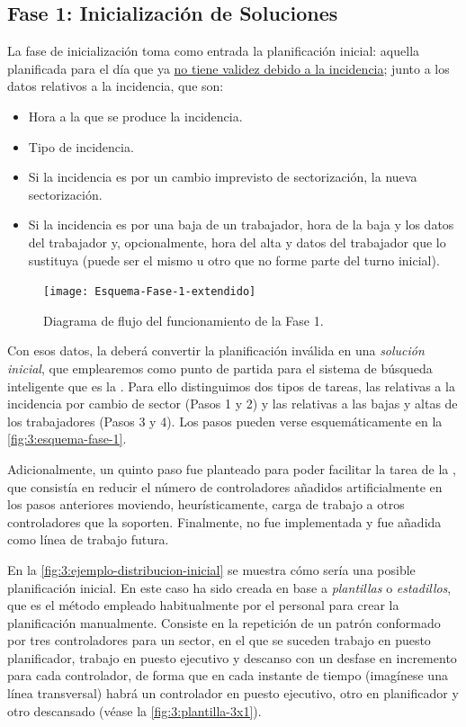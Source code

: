\subsection{Fase 1: Inicialización de Soluciones} \label{sec:3:inicializacion-soluciones}

La fase de inicialización toma como entrada la planificación inicial: aquella planificada para el día que ya \underline{no tiene validez debido a la incidencia}; junto a los datos relativos a la incidencia, que son:

\begin{itemize}
	\item Hora a la que se produce la incidencia.
	\item Tipo de incidencia.
	\item Si la incidencia es por un cambio imprevisto de sectorización, la nueva sectorización.
	\item Si la incidencia es por una baja de un trabajador, hora de la baja y los datos del trabajador y, opcionalmente, hora del alta y datos del trabajador que lo sustituya (puede ser el mismo u otro que no forme parte del turno inicial).
\end{itemize}

\begin{figure}[htbp]
	\centering
	\texttt{[image: Esquema-Fase-1-extendido]}
	\caption{Diagrama de flujo del funcionamiento de la Fase 1.}
	\label{fig:3:esquema-fase-1}
\end{figure}

Con esos datos, la \faseuno{} deberá convertir la planificación inválida en una \textit{solución inicial}, que 
emplearemos como punto de partida para el sistema de búsqueda inteligente que es la \fasedos{}.
Para ello distinguimos dos tipos de tareas, las relativas a la incidencia por cambio de sector (Pasos 1 y 2) y las relativas a las bajas y altas de los trabajadores (Pasos 3 y 4).
Los pasos pueden verse esquemáticamente en la \autoref{fig:3:esquema-fase-1}.

Adicionalmente, un quinto paso fue planteado para poder facilitar la tarea de la \fasedos{}, que consistía en reducir el número de controladores añadidos artificialmente en los pasos anteriores moviendo, heurísticamente, carga de trabajo a otros controladores que la soporten.
Finalmente, no fue implementada y fue añadida como línea de trabajo futura.

En la \autoref{fig:3:ejemplo-distribucion-inicial} se muestra cómo sería una posible planificación inicial.
En este caso ha sido creada en base a \textit{plantillas} o \textit{estadillos}, que es el método empleado habitualmente por el personal para crear la planificación manualmente.
Consiste en la repetición de un patrón conformado por tres controladores para un sector, en el que se suceden trabajo en puesto planificador, trabajo en puesto ejecutivo y descanso con un desfase en incremento para cada controlador, de forma que en cada instante de tiempo (imagínese una línea transversal) habrá un controlador en puesto ejecutivo, otro en planificador y otro descansado (véase  la \autoref{fig:3:plantilla-3x1}).

